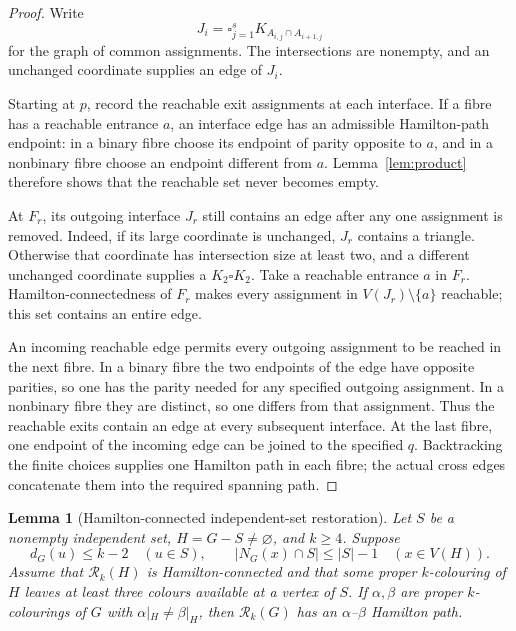 \documentclass[11pt]{article}
\newtheorem{lemma}[theorem]{Lemma}
\theoremstyle{remark}
\newcommand{\Rk}{\mathcal R_k}
\numberwithin{equation}{section}
\begin{document}
\begin{proof}
Write
\[
 J_i=\square_{j=1}^s K_{A_{i,j}\cap A_{i+1,j}}
\]
for the graph of common assignments.  The intersections are nonempty,
and an unchanged coordinate supplies an edge of $J_i$.

Starting at $p$, record the reachable exit assignments at each
interface.  If a fibre has a reachable entrance $a$, an interface edge
has an admissible Hamilton-path endpoint: in a binary fibre choose its
endpoint of parity opposite to $a$, and in a nonbinary fibre choose an
endpoint different from $a$.  Lemma~\ref{lem:product} therefore shows
that the reachable set never becomes empty.

At $F_r$, its outgoing interface $J_r$ still contains an edge after any
one assignment is removed.  Indeed, if its large coordinate is
unchanged, $J_r$ contains a triangle.  Otherwise that coordinate has
intersection size at least two, and a different unchanged coordinate
supplies a $K_2\square K_2$.  Take a reachable entrance $a$ in $F_r$.
Hamilton-connectedness of $F_r$ makes every assignment in
$V(J_r)\setminus\{a\}$ reachable; this set contains an entire edge.

An incoming reachable edge permits every outgoing assignment to be
reached in the next fibre.  In a binary fibre the two endpoints of the
edge have opposite parities, so one has the parity needed for any
specified outgoing assignment.  In a nonbinary fibre they are distinct,
so one differs from that assignment.  Thus the reachable exits contain
an edge at every subsequent interface.  At the last fibre, one endpoint
of the incoming edge can be joined to the specified $q$.  Backtracking
the finite choices supplies one Hamilton path in each fibre; the actual
cross edges concatenate them into the required spanning path.
\end{proof}

\begin{lemma}[Hamilton-connected independent-set restoration]
\label{lem:independent-hc}
Let $S$ be a nonempty independent set, $H=G-S\ne\varnothing$, and
$k\ge4$.  Suppose
\[
 d_G(u)\le k-2\quad(u\in S),\qquad
 |N_G(x)\cap S|\le |S|-1\quad(x\in V(H)).
\]
Assume that $\Rk(H)$ is Hamilton-connected and that some proper
$k$-colouring of $H$ leaves at least three colours available at a vertex
of $S$.  If $\alpha,\beta$ are proper $k$-colourings of $G$ with
$\alpha|_H\ne\beta|_H$, then $\Rk(G)$ has an
$\alpha$--$\beta$ Hamilton path.
\end{lemma}
\end{document}
